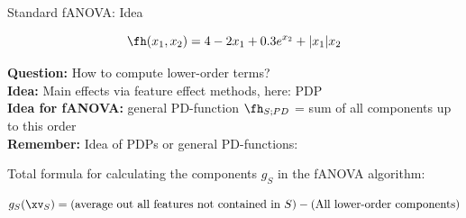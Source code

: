 \documentclass[11pt,compress,t,notes=noshow, aspectratio=169, xcolor=table]{beamer}
\begin{document}
\begin{frame}{Standard fANOVA: Idea}

    \begin{equation}
        \fh(x_1, x_2) = 4 - 2x_1 + 0.3 e^{x_2} + |x_1|x_2
    \end{equation}

    \textbf{Question:} How to compute lower-order terms? \\
    \textbf{Idea:} Main effects via feature effect methods, here: PDP\\
    \textbf{Idea for fANOVA:} general PD-function $\fh_{S;PD}$ = sum of all components up to this order\\
    \textbf{Remember:} Idea of PDPs or general PD-functions: 

    Total formula for calculating the components \(g_S\) in the fANOVA algorithm:

    \begin{equation*}
        g_{S} (\xv_S) = (\text{average out all features not contained in } S) - (\text{All lower-order components})
    \end{equation*}
    
\end{frame}
\end{document}
